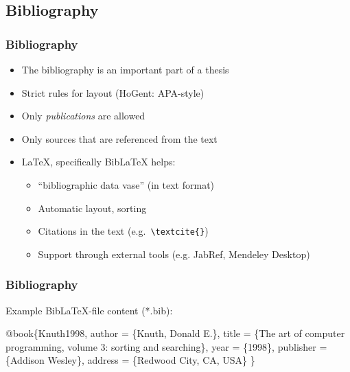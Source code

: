 \documentclass{beamer}
\begin{document}
\subsection{Bibliography}

\begin{frame}[fragile]
  \frametitle{Bibliography}

  \begin{itemize}
  \item<+-> The bibliography is an important part of a thesis
  \item<+-> Strict rules for layout (HoGent: APA-style)
  \item<+-> Only \emph{publications} are allowed
  \item<+-> Only sources that are referenced from the text
  \item<+-> {\LaTeX}, specifically Bib{\LaTeX} helps:
    \begin{itemize}
    \item<+-> ``bibliographic data vase'' (in text format)
    \item<+-> Automatic layout, sorting
    \item<+-> Citations in the text (e.g.~\verb|\textcite{}|)
    \item<+-> Support through external tools (e.g. JabRef, Mendeley Desktop)
    \end{itemize}
  \end{itemize}
\end{frame}

\begin{frame}[fragile]
  \frametitle{Bibliography}

Example Bib{\LaTeX}-file content (*.bib):

\begin{semiverbatim}
\alert<2>{@book}\{\alert<4>{Knuth1998},
 \alert<3>{author} = \{Knuth, Donald E.\},
 \alert<3>{title} = \{The art of computer programming,  volume 3:
   sorting and searching\},
 \alert<3>{year} = \{1998\},
 publisher = \{Addison Wesley\},
 address = \{Redwood City, CA, USA\}
\} 
\end{semiverbatim}


\end{frame}
\end{document}
